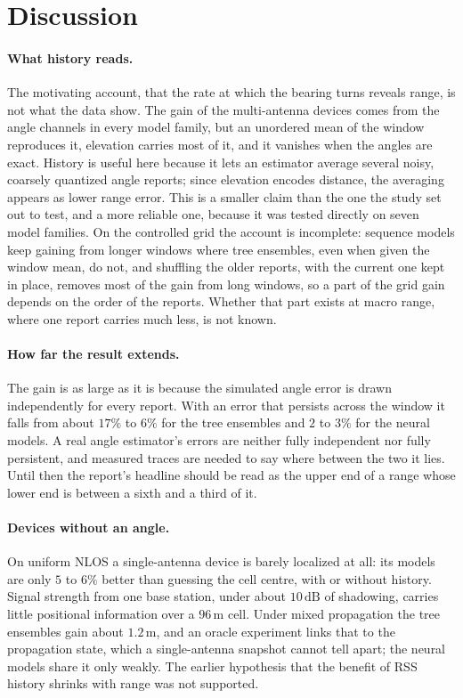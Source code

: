 \section{Discussion}
\label{sec:discussion}

\paragraph{What history reads.}
The motivating account, that the rate at which the bearing turns reveals range, is not what the data show. The gain of the multi-antenna devices comes from the angle channels in every model family, but an unordered mean of the window reproduces it, elevation carries most of it, and it vanishes when the angles are exact. History is useful here because it lets an estimator average several noisy, coarsely quantized angle reports; since elevation encodes distance, the averaging appears as lower range error. This is a smaller claim than the one the study set out to test, and a more reliable one, because it was tested directly on seven model families. On the controlled grid the account is incomplete: sequence models keep gaining from longer windows where tree ensembles, even when given the window mean, do not, and shuffling the older reports, with the current one kept in place, removes most of the gain from long windows, so a part of the grid gain depends on the order of the reports. Whether that part exists at macro range, where one report carries much less, is not known.

\paragraph{How far the result extends.}
The gain is as large as it is because the simulated angle error is drawn independently for every report. With an error that persists across the window it falls from about $17\%$ to $6\%$ for the tree ensembles and $2$ to $3\%$ for the neural models. A real angle estimator's errors are neither fully independent nor fully persistent, and measured traces are needed to say where between the two it lies. Until then the report's headline should be read as the upper end of a range whose lower end is between a sixth and a third of it.

\paragraph{Devices without an angle.}
On uniform NLOS a single-antenna device is barely localized at all: its models are only $5$ to $6\%$ better than guessing the cell centre, with or without history. Signal strength from one base station, under about $10\,\text{dB}$ of shadowing, carries little positional information over a $96\,\text{m}$ cell. Under mixed propagation the tree ensembles gain about $1.2\,\text{m}$, and an oracle experiment links that to the propagation state, which a single-antenna snapshot cannot tell apart; the neural models share it only weakly. The earlier hypothesis that the benefit of RSS history shrinks with range was not supported.

